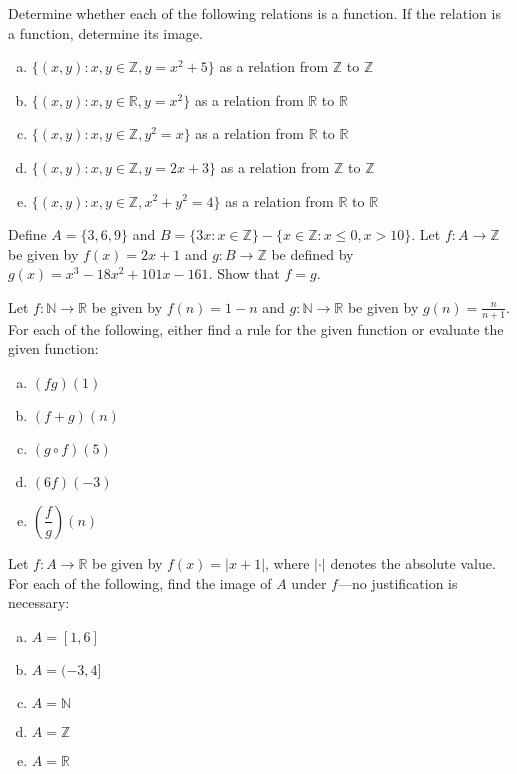 \documentclass[11pt,letterpaper]{article}
\begin{document}

 Determine whether each of the following relations is a function. If the relation is a function, determine its image.
	\begin{enumerate}[(a)]
	\item $\{ (x, y) \colon x, y \in \mathbb{Z}, y= x^2 + 5 \}$ as a relation from $\mathbb{Z}$ to $\mathbb{Z}$
	\item $\{ (x, y) \colon x, y \in \mathbb{R}, y= x^2 \}$ as a relation from $\mathbb{R}$ to $\mathbb{R}$
	\item $\{ (x, y) \colon x, y \in \mathbb{Z}, y^2= x \}$ as a relation from $\mathbb{R}$ to $\mathbb{R}$
	\item $\{ (x, y) \colon x, y \in \mathbb{Z}, y= 2x + 3 \}$ as a relation from $\mathbb{Z}$ to $\mathbb{Z}$
	\item $\{ (x, y) \colon x, y \in \mathbb{Z}, x^2 + y^2= 4 \}$ as a relation from $\mathbb{R}$ to $\mathbb{R}$
	\end{enumerate}



\newpage



 Define $A= \{ 3, 6, 9 \}$ and $B= \{ 3x \colon x \in \mathbb{Z} \} - \{ x \in \mathbb{Z} \colon x \leq 0, x > 10 \}$. Let $f: A \to \mathbb{Z}$ be given by $f(x)= 2x + 1$ and $g: B \to \mathbb{Z}$ be defined by $g(x)= x^3 - 18x^2 + 101x - 161$. Show that $f= g$.



\newpage



 Let $f: \mathbb{N} \to \mathbb{R}$ be given by $f(n)= 1 - n$ and $g: \mathbb{N} \to \mathbb{R}$ be given by $g(n)= \frac{n}{n + 1}$. For each of the following, either find a rule for the given function or evaluate the given function:
	\begin{enumerate}[(a)]
	\item $(fg)(1)$
	\item $(f + g)(n)$
	\item $(g \circ f)(5)$
	\item $(6f)(-3)$
	\item $\left( \dfrac{f}{g} \right)(n)$
	\end{enumerate}



\newpage



 Let $f: A \to \mathbb{R}$ be given by $f(x)= |x + 1|$, where $| \cdot |$ denotes the absolute value. For each of the following, find the image of $A$ under $f$---no justification is necessary: 
	\begin{enumerate}[(a)]
	\item $A= [1, 6]$
	\item $A= (-3, 4]$
	\item $A= \mathbb{N}$
	\item $A= \mathbb{Z}$
	\item $A= \mathbb{R}$
	\end{enumerate}
\end{document}
